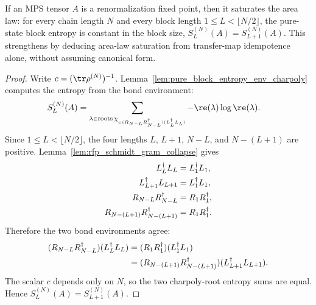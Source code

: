 \begin{theorem}
    \label{thm:rfp-saturates-area-law}
    \leanok
    If an MPS tensor $A$ is a renormalization fixed point, then it saturates the
    area law: for every chain length $N$ and every block length
    $1\le L<\lfloor N/2\rfloor$, the pure-state block entropy is constant in the
    block size, $S_L^{(N)}(A)=S_{L+1}^{(N)}(A)$.
    This strengthens \cite[Proposition~3.14, lines~606--608]{Cirac2016MPDO_arXiv}
    by deducing area-law saturation from transfer-map idempotence alone, without
    assuming canonical form.
\end{theorem}
\begin{proof}\leanok
    Write $c=(\tr\rho^{(N)})^{-1}$. Lemma~\ref{lem:pure_block_entropy_env_charpoly}
    computes the entropy from the bond environment:
    \begin{align}
        S_L^{(N)}(A)
         & =
        \sum_{\lambda\in
            \operatorname{roots}\chi_{c\,(R_{N-L}R_{N-L}^\dagger)
                (L_L^\dagger L_L)}}
        -\re(\lambda)\log\re(\lambda).
        \notag
    \end{align}
    Since $1\le L<\lfloor N/2\rfloor$, the four lengths
    $L$, $L+1$, $N-L$, and $N-(L+1)$ are positive.
    Lemma~\ref{lem:rfp_schmidt_gram_collapse} gives
    \begin{align}
        L_L^\dagger L_L
         & =L_1^\dagger L_1,
        \notag               \\
        L_{L+1}^\dagger L_{L+1}
         & =L_1^\dagger L_1,
        \notag               \\
        R_{N-L}R_{N-L}^\dagger
         & =R_1R_1^\dagger,
        \notag               \\
        R_{N-(L+1)}R_{N-(L+1)}^\dagger
         & =R_1R_1^\dagger.
        \notag
    \end{align}
    Therefore the two bond environments agree:
    \begin{align}
        (R_{N-L}R_{N-L}^\dagger)(L_L^\dagger L_L)
         & =
        (R_1R_1^\dagger)(L_1^\dagger L_1)
        \notag \\
         & =
        (R_{N-(L+1)}R_{N-(L+1)}^\dagger)
        (L_{L+1}^\dagger L_{L+1}).
        \notag
    \end{align}
    The scalar $c$ depends only on $N$, so the two charpoly-root entropy sums
    are equal. Hence $S_L^{(N)}(A)=S_{L+1}^{(N)}(A)$.
\end{proof}

